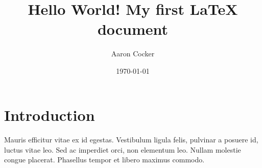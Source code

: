\documentclass[a4paper,12pt]{article}
\begin{document}
\title{Hello World! My first LaTeX document}
\author{Aaron Cocker}
\date{\today}
\maketitle

\section{Introduction}

\paragraph{}
Mauris efficitur vitae ex id egestas. Vestibulum ligula felis, pulvinar a posuere id, luctus vitae leo. Sed ac imperdiet orci, non elementum leo. Nullam molestie congue placerat. Phasellus tempor et libero maximus commodo.
\end{document}
